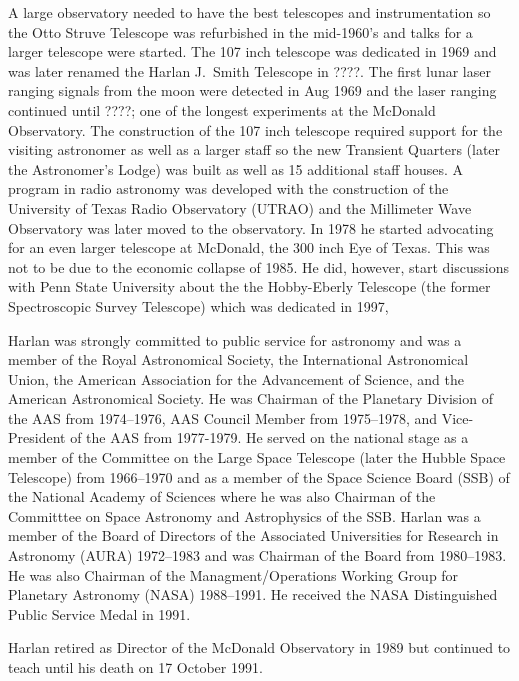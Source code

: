 A large observatory needed to have the best telescopes and
instrumentation so the Otto Struve Telescope was refurbished in the
mid-1960's and talks for a larger telescope were started.  The 107
inch telescope was dedicated in 1969 and was later renamed the Harlan
J.~Smith Telescope in ????. The first lunar laser ranging signals
from the moon were detected in Aug 1969 and the laser ranging
continued until ????; one of the longest experiments at the McDonald
Observatory. The construction of the 107 inch telescope required
support for the visiting astronomer as well as a larger staff so the
new Transient Quarters (later the Astronomer's Lodge) was built as
well as 15 additional staff houses. A program in radio astronomy was
developed with the construction of the University of Texas Radio
Observatory (UTRAO) and the Millimeter Wave Observatory was later
moved to the observatory. In 1978 he started advocating for an even
larger telescope at McDonald, the 300 inch Eye of Texas. This was not
to be due to the economic collapse of 1985. He did, however, start
discussions with Penn State University about the the Hobby-Eberly
Telescope (the former Spectroscopic Survey Telescope) which was
dedicated in 1997,

Harlan was strongly committed to public service for astronomy and was
a member of the Royal Astronomical Society, the International
Astronomical Union, the American Association for the Advancement of
Science, and the American Astronomical Society. He was Chairman of the
Planetary Division of the AAS from 1974--1976, AAS Council Member from
1975--1978, and Vice-President of the AAS from 1977-1979. He served on
the national stage as a member of the Committee on the Large Space
Telescope (later the Hubble Space Telescope) from 1966--1970 and as a
member of the Space Science Board (SSB) of the National Academy of
Sciences where he was also Chairman of the Committtee on Space
Astronomy and Astrophysics of the SSB. Harlan was a member of the
Board of Directors of the Associated Universities for Research in
Astronomy (AURA) 1972--1983 and was Chairman of the Board from
1980--1983. He was also Chairman of the Managment/Operations Working
Group for Planetary Astronomy (NASA) 1988--1991.  He received
the NASA Distinguished Public Service Medal in 1991.

Harlan retired as Director of the McDonald Observatory in 1989 but
continued to teach until his death on 17 October 1991.



